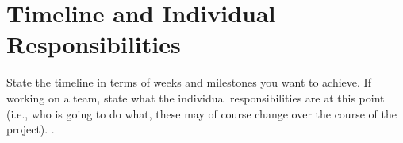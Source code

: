 \documentclass{article}
\begin{document}



\section{Timeline and Individual Responsibilities}

State the timeline in terms of weeks and milestones you want to achieve. If working on a team, state what the individual responsibilities are at this point (i.e., who is going to do what, these may of course change over the course of the project). \cite{short2010no}.



\end{document}

